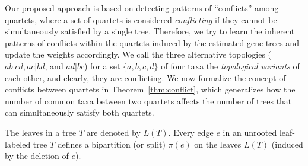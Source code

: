 \documentclass[10pt,a4paper]{article}
\begin{document}
Our proposed approach is based on detecting patterns of ``conflicts'' among quartets, where a set of quartets is considered \textit{conflicting} if they cannot be simultaneously satisfied by a single tree. Therefore, we try to learn the inherent patterns of conflicts within the quartets induced by the estimated gene trees and update the weights accordingly. We call the three alternative topologies ($ab|cd, ac|bd$, and $ad|bc$) for a set $\{a,b,c,d\}$ of four taxa the \textit{topological variants} of each other, and clearly, they are conflicting. We now formalize the concept of conflicts between quartets in Theorem~\ref{thm:conflict}, which generalizes how the number of common taxa between two quartets affects the number of trees that can simultaneously satisfy both quartets.


The leaves in a tree $T$ are denoted by $L(T)$.
Every edge $e$ in an unrooted leaf-labeled tree $T$ defines a bipartition (or split) $\pi(e)$ on the leaves $L(T)$ (induced by the deletion of $e$). 
\end{document}
